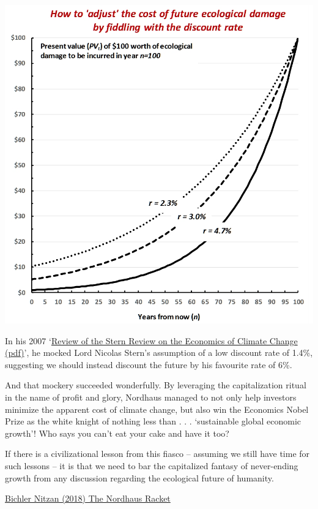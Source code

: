 \documentclass[
]{book}
\begin{document}
\includegraphics{fig/discount_rate.jpg}

In his 2007 `\href{pdf/Nordhaus_2007_Review_of_Stern.pdf}{Review of the Stern Review on the Economics of Climate Change (pdf)}', he mocked Lord Nicolas Stern's assumption of a low discount rate of 1.4\%, suggesting we should instead discount the future by his favourite rate of 6\%.

And that mockery succeeded wonderfully. By leveraging the capitalization ritual in the name of profit and glory, Nordhaus managed to not only help investors minimize the apparent cost of climate change, but also win the Economics Nobel Prize as the white knight of nothing less than . . . `sustainable global economic growth'! Who says you can't eat your cake and have it too?

If there is a civilizational lesson from this fiasco -- assuming we still have time for such lessons -- it is that we need to bar the capitalized fantasy of never-ending growth from any discussion regarding the ecological future of humanity.

\href{https://rwer.wordpress.com/2018/11/05/the-nordhaus-racket-how-to-use-capitalization-to-minimize-the-cost-of-climate-change-and-win-a-nobel-for-sustainable-growth/}{Bichler Nitzan (2018) The Nordhaus Racket}
\end{document}
